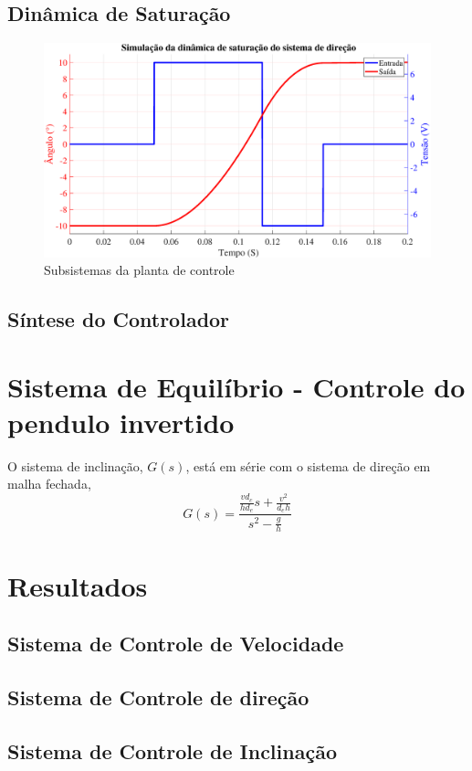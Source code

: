 	    \subsection{Dinâmica de Saturação}
	    
	        \begin{figure}[h]
                \centering
                \includegraphics[width=15cm]{Imagens/cap4/sis_direcao/simusat_direcao.eps}
                \caption{Subsistemas da planta de controle}
                \label{subsistemas}
            \end{figure}
            
        \subsection{Síntese do Controlador}
        
        
        
        
	\section{Sistema de Equilíbrio - Controle do pendulo invertido}
	    
	    O sistema de inclinação, $G(s)$, está em série com o sistema de direção em malha fechada, 
	    \begin{equation}
	        G(s) = \frac{ \frac{v d_c}{h d_e} s + \frac{v^2}{d_e h} }{ s^2 - \frac{g}{h} }
	    \end{equation}
	    
	    
	\section{Resultados}
	
	    \subsection{Sistema de Controle de Velocidade}
	    \subsection{Sistema de Controle de direção}
	    \subsection{Sistema de Controle de Inclinação}
	    